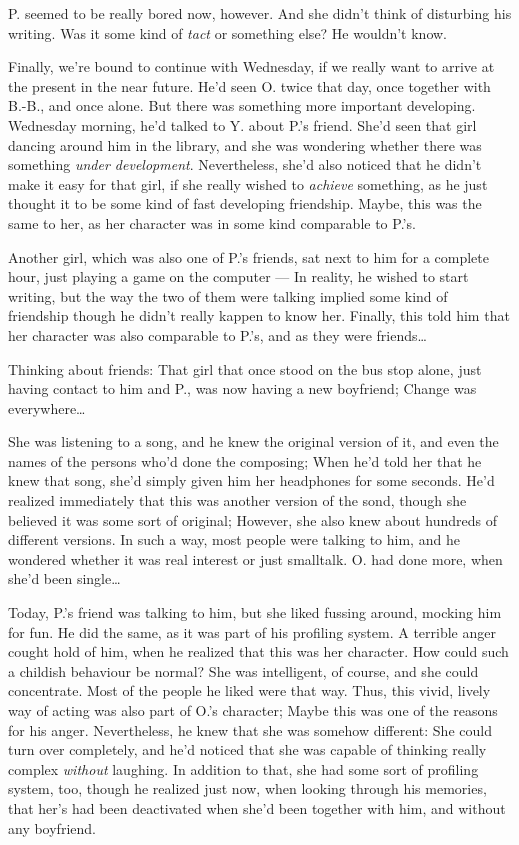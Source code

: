 P. seemed to be really bored now, however. And she didn't think of disturbing his writing. Was it some kind of \emph{tact} or something else?
He wouldn't know.

Finally, we're bound to continue with Wednesday, if we really want to arrive at the present in the near future. 
He'd seen O. twice that day, once together with B.-B., and once alone. 
But there was something more important developing. 
Wednesday morning, he'd talked to Y. about P.'s friend. 
She'd seen that girl dancing around him in the library, and she was wondering whether there was something \emph{under development}. Nevertheless, she'd also noticed that he didn't make it easy for that girl, if she really wished to \emph{achieve} something, as he just thought it to be some kind of fast developing friendship. 
Maybe, this was the same to her, as her character was in some kind comparable to P.'s.

Another girl, which was also one of P.'s friends, sat next to him for a complete hour, just playing a game on the computer --- In reality, he wished to start writing, but the way the two of them were talking implied some kind of friendship though he didn't really kappen to know her. Finally, this told him that her character was also comparable to P.'s, and as they were friends\dots{}

Thinking about friends: That girl that once stood on the bus stop alone, just having contact to him and P., was now having a new boyfriend; Change was everywhere\dots{}

She was listening to a song, and he knew the original version of it, and even the names of the persons who'd done the composing; When he'd told her that he knew that song, she'd simply given him her headphones for some seconds. He'd realized immediately that this was another version of the sond, though she believed it was some sort of original; However, she also knew about hundreds of different versions. 
In such a way, most people were talking to him, and he wondered whether it was real interest or just smalltalk. O. had done more, when she'd been single\dots{}

Today, P.'s friend was talking to him, but she liked fussing around, mocking him for fun. He did the same, as it was part of his profiling system. 
A terrible anger cought hold of him, when he realized that this was her character. How could such a childish behaviour be normal? She was intelligent, of course, and she could concentrate. 
Most of the people he liked were that way. Thus, this vivid, lively way of acting was also part of O.'s character; Maybe this was one of the reasons for his anger. Nevertheless, he knew that she was somehow different: She could turn over completely, and he'd noticed that she was capable of thinking really complex \emph{without} laughing. In addition to that, she had some sort of profiling system, too, though he realized just now, when looking through his memories, that her's had been deactivated when she'd been together with him, and without any boyfriend.

